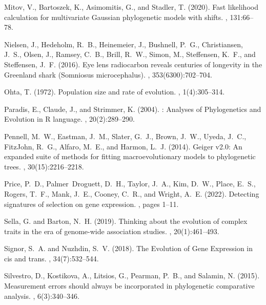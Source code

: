 \documentclass{article}
\begin{document}
\begin{thebibliography}{}
Mitov, V., Bartoszek, K., Asimomitis, G., and Stadler, T. (2020).
\newblock Fast likelihood calculation for multivariate {{Gaussian}}
  phylogenetic models with shifts.
, 131:66--78.

Nielsen, J., Hedeholm, R.~B., Heinemeier, J., Bushnell, P.~G., Christiansen,
  J.~S., Olsen, J., Ramsey, C.~B., Brill, R.~W., Simon, M., Steffensen, K.~F.,
  and Steffensen, J.~F. (2016).
\newblock Eye lens radiocarbon reveals centuries of longevity in the
  {{Greenland}} shark ({{Somniosus}} microcephalus).
, 353(6300):702--704.

Ohta, T. (1972).
\newblock Population size and rate of evolution.
, 1(4):305--314.

Paradis, E., Claude, J., and Strimmer, K. (2004).
: {{Analyses}} of {{Phylogenetics}} and {{Evolution}} in {{R}}
  language.
, 20(2):289--290.

Pennell, M.~W., Eastman, J.~M., Slater, G.~J., Brown, J.~W., Uyeda, J.~C.,
  FitzJohn, R.~G., Alfaro, M.~E., and Harmon, L.~J. (2014).
\newblock Geiger v2.0: An expanded suite of methods for fitting
  macroevolutionary models to phylogenetic trees.
, 30(15):2216--2218.

Price, P.~D., Palmer~Droguett, D.~H., Taylor, J.~A., Kim, D.~W., Place, E.~S.,
  Rogers, T.~F., Mank, J.~E., Cooney, C.~R., and Wright, A.~E. (2022).
\newblock Detecting signatures of selection on gene expression.
, pages 1--11.

Sella, G. and Barton, N.~H. (2019).
\newblock Thinking about the evolution of complex traits in the era of
  genome-wide association studies.
, 20(1):461--493.

Signor, S.~A. and Nuzhdin, S.~V. (2018).
\newblock The {{Evolution}} of {{Gene Expression}} in cis and trans.
, 34(7):532--544.

Silvestro, D., Kostikova, A., Litsios, G., Pearman, P.~B., and Salamin, N.
  (2015).
\newblock Measurement errors should always be incorporated in phylogenetic
  comparative analysis.
, 6(3):340--346.


\end{thebibliography}
\end{document}
